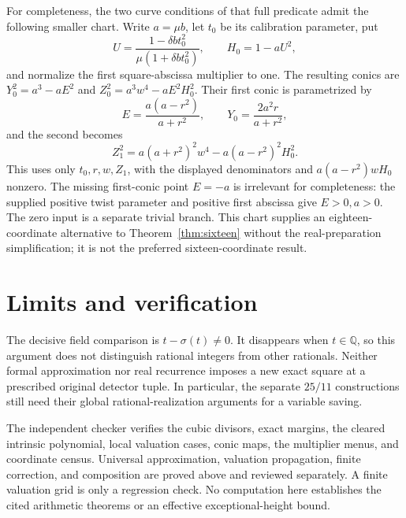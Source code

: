 \documentclass[11pt,a4paper]{article}
\newcommand{\Q}{\mathbb Q}\newcommand{\Z}{\mathbb Z}
\begin{document}
For completeness, the two curve conditions of that full predicate admit
the following smaller chart. Write $a=\mu b$, let $t_0$ be its calibration
parameter, put
\[
 U=\frac{1-\delta b t_0^2}{\mu(1+\delta b t_0^2)},\qquad H_0=1-aU^2,
\]
and normalize the first square-abscissa multiplier to one. The resulting
conics are $Y_0^2=a^3-aE^2$ and
$Z_0^2=a^3w^4-aE^2H_0^2$. Their first conic is parametrized by
\[
 E=\frac{a(a-r^2)}{a+r^2},\qquad
 Y_0=\frac{2a^2r}{a+r^2},
\]
and the second becomes
\[
 Z_1^2=a(a+r^2)^2w^4-a(a-r^2)^2H_0^2.
\]
This uses only $t_0,r,w,Z_1$, with the displayed denominators and
$a(a-r^2)wH_0$ nonzero. The missing first-conic point $E=-a$ is
irrelevant for completeness: the supplied positive twist parameter
and positive first abscissa give $E>0,a>0$. The zero input is a separate
trivial branch. This chart supplies an eighteen-coordinate alternative
to Theorem~\ref{thm:sixteen} without the real-preparation simplification;
it is not the preferred sixteen-coordinate result.

\section{Limits and verification}

The decisive field comparison is $t-\sigma(t)\ne0$. It disappears
when $t\in\Q$, so this argument does not distinguish rational integers
from other rationals. Neither formal approximation nor real recurrence
imposes a new exact square at a prescribed original detector tuple.
In particular, the separate $25/11$ constructions still need their
global rational-realization arguments for a variable saving.

The independent checker verifies the cubic divisors, exact margins,
the cleared intrinsic polynomial, local valuation cases, conic maps,
the multiplier menus, and coordinate census. Universal approximation,
valuation propagation, finite correction, and composition are proved
above and reviewed separately. A finite valuation grid is only a
regression check. No computation here establishes the cited arithmetic
theorems or an effective exceptional-height bound.
\end{document}
